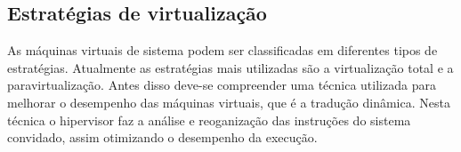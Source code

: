 


\subsection{Estratégias de virtualização}
\label{section:virtestrat}

As máquinas virtuais de sistema podem ser classificadas em diferentes tipos de estratégias. Atualmente as estratégias mais utilizadas
são a virtualização total e a paravirtualização. Antes disso deve-se compreender uma técnica utilizada para melhorar o desempenho das 
máquinas virtuais, que é a tradução dinâmica. Nesta técnica o hipervisor faz a análise e reoganização das instruções do sistema convidado, 
assim otimizando o desempenho da execução.

